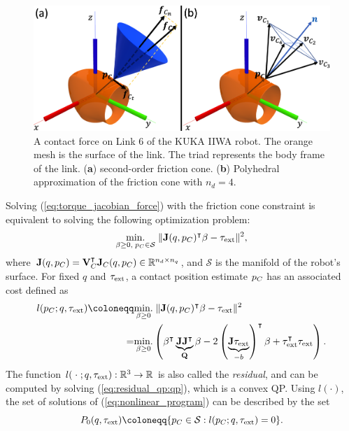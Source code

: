 \begin{figure}[h]
\centering
\includegraphics[width=0.98\linewidth]{figures/05_force_from_torque/friction_cone.png}
\caption{A contact force on Link 6 of the KUKA IIWA robot. The orange mesh is the surface of the link. The triad represents the body frame of the link. (\textbf{a}) second-order friction cone. (\textbf{b}) Polyhedral approximation of the friction cone with $n_d=4$.}
\label{fig:friction_cone}
\end{figure}

Solving (\ref{eq:torque_jacobian_force}) with the friction cone constraint is equivalent to solving the following optimization problem:
\begin{equation}
\label{eq:nonlinear_program}
\underset{{\beta} \geq 0, \; p_{C} \in \mathcal{S}}{\text{min.}} \; \| \mathbf{J}({q}, p_{C})^{\intercal} {\beta} - {\tau}_\text{ext} \|^2,
\end{equation}
where $\mathbf{J}({q}, p_{C}) = \mathbf{V}_C^\intercal \mathbf{J}_C({q}, p_{C}) \in \mathbb{R}^{n_d \times n_q}$, and $\mathcal{S}$ is the manifold of the robot's surface. For fixed ${q}$ and $\tau_{\text{ext}}$, a contact position estimate $p_{C}$ has an associated cost defined as
\begin{subequations}
\label{eq:residual_qp}
\begin{align}
l(\pCbar; {q}, \tauE) \coloneqq& \underset{{\beta} \geq 0}{\text{min.}} \; \| \J({q}, \pCbar)^{\intercal} {\beta} - {\tau}_\text{ext} \|^2 \\
=& \underset{{\beta} \geq 0}{\text{min.}} \left({\beta}^\intercal \underbrace{\J\J^\intercal}_{\mathbf{Q}} {\beta} - 2 \left(\underbrace{\J \tauE}_{-{b}}\right)^\intercal {\beta} + \tauE^\intercal \tauE \right). \label{eq:residual_qp:qp}
\end{align}
\end{subequations}
The function $l(\; \cdot \;; {q}, \tau_{\text{ext}}): \mathbb{R}^3 \rightarrow \mathbb{R}$ is also called the \textit{residual}, and can be computed by solving (\ref{eq:residual_qp:qp}), which is a convex QP. Using $l(\cdot)$, the set of solutions of (\ref{eq:nonlinear_program}) can be described by the set
\begin{equation}
P_0(q, \tauE) \coloneqq \{\pCbar \in \mathcal{S} : l(\pCbar; q, \tauE) = 0\}.
\end{equation}

